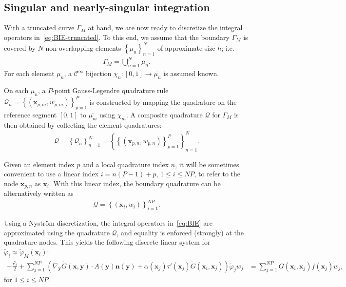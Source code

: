 \documentclass[review,hidelinks,onefignum,onetabnum]{siamart220329}
\newcommand{\bn}{\mathbf{n}}
\newcommand{\bx}{\mathbf{x}}
\newcommand{\by}{\mathbf{y}}
\newcommand{\tvarphi}{\widetilde \varphi}
\begin{document}

\subsection{Singular and nearly-singular integration}
\label{sec:discretization-error}

With a truncated curve $\Gamma_M$ at hand, we are now ready to discretize the integral operators in~\cref{eq:BIE-truncated}. To this end, we assume that the boundary $\Gamma_M$ is covered by $N$ non-overlapping elements $\left\{ \mu_n \right\}_{n=1}^N$ of approximate size $h$; i.e. 
\begin{align}
  \Gamma_M = \bigcup_{n=1}^N \overline{\mu}_n.
\end{align}
For each element $\mu_n$, a $\mathcal{C}^\infty$ bijection $\chi_n : [0,1] \to \overline{\mu_n}$ is assumed known.

On each $\mu_n$, a $P$-point Gauss-Legendre quadrature rule $\mathcal{Q}_n = \left\{ \left( \bx_{p,m}, w_{p,m} \right) \right\}_{p=1}^P$ is constructed by mapping the quadrature on the reference segment $[0,1]$ to $\overline{\mu_m}$ using $\chi_m$. A composite quadrature $\mathcal{Q}$ for $\Gamma_{M}$ is then obtained by collecting the element quadratures:
\begin{align}
  \mathcal{Q} = \left\{ \mathcal{Q}_n \right\}_{n=1}^N = \left\{ \left\{ \left( \bx_{p,n}, w_{p,n} \right) \right\}_{p=1}^P \right\}_{n=1}^N.
\end{align}

Given an element index $p$ and a local quadrature index $n$, it will be sometimes convenient to use a linear index $i = n(P-1) + p$, $1 \leq i \leq NP$, to refer to the node $\bx_{p,n}$ as $\bx_i$. With this linear index, the boundary quadrature can be alternatively written as 
\begin{align}
  \mathcal{Q} = \left\{ \left( \bx_{i}, w_{i} \right) \right\}_{i=1}^{NP}.
\end{align}

Using a Nyström discretization, the integral operators in~\cref{eq:BIE} are approximated using the quadrature $\mathcal{Q}$, and equality is enforced (strongly) at the quadrature nodes. This yields the following discrete linear system for $\tvarphi_{i} \approx\tvarphi_M(\bx_i)$:
\begin{align}
    \label{eq:discrete-BIE}
    -\frac{\tvarphi_i}{2} + \sum_{j=1}^{NP} \left( \nabla_{\by} \widetilde{G}(\bx,\by) \cdot A(\by)\bn(\by) + \alpha(\bx_j)\tau'(\bx_j)\widetilde{G}(\bx_i,\bx_j) \right)\tvarphi_j w_j &= \sum_{j=1}^{NP} G(\bx_i,\bx_j) f(\bx_j)w_j,
\end{align}
for $1 \leq i \leq NP$.
\end{document}
